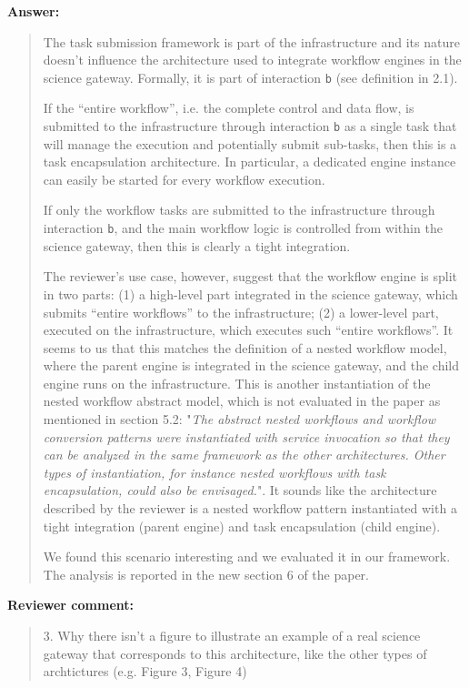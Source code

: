 \documentclass[a4]{article}
\newenvironment{review}%
{\textbf{Reviewer comment:}\begin{quote}}%
{\end{quote}}%
\newenvironment{answer}%
{\textbf{Answer:}\begin{small}\begin{quote}}%
{\end{quote}\end{small}}%
\begin{document}
\begin{answer}
  The task submission framework is part of the infrastructure
  and its nature doesn't influence the architecture used to integrate
  workflow engines in the science gateway. Formally, it is part of
  interaction \texttt{b} (see definition in 2.1).

  If the ``entire workflow'', i.e. the complete control and data flow,
  is submitted to the infrastructure through interaction \texttt{b} as
  a single task that will manage the execution and potentially submit
  sub-tasks, then this is a task encapsulation architecture. In
  particular, a dedicated engine instance can easily be started for
  every workflow execution.

  If only the workflow tasks are submitted to the infrastructure
  through interaction \texttt{b}, and the main workflow logic is
  controlled from within the science gateway, then this is clearly a
  tight integration.

  The reviewer's use case, however, suggest that the workflow engine
  is split in two parts: (1) a high-level part integrated in the
  science gateway, which submits ``entire workflows'' to the
  infrastructure; (2) a lower-level part, executed on the
  infrastructure, which executes such ``entire workflows''. It seems
  to us that this matches the definition of a nested workflow model,
  where the parent engine is integrated in the science gateway, and
  the child engine runs on the infrastructure. This is another
  instantiation of the nested workflow abstract model, which is not
  evaluated in the paper as mentioned in section 5.2: "\emph{The
    abstract nested workflows and workflow conversion patterns were
    instantiated with service invocation so that they can be analyzed
    in the same framework as the other architectures. Other types of
    instantiation, for instance nested workflows with task
    encapsulation, could also be envisaged.}". It sounds like the
  architecture described by the reviewer is a nested workflow pattern
  instantiated with a tight integration (parent engine) and task
  encapsulation (child engine).

  We found this scenario interesting and we evaluated it in our
  framework. The analysis is reported in the new section 6 of the
  paper.
\end{answer}

\begin{review}
  3. Why there isn't a figure to illustrate an example of a real
  science gateway that corresponds to this architecture, like the
  other types of archtictures (e.g. Figure 3, Figure 4)
\end{review}
\end{document}
